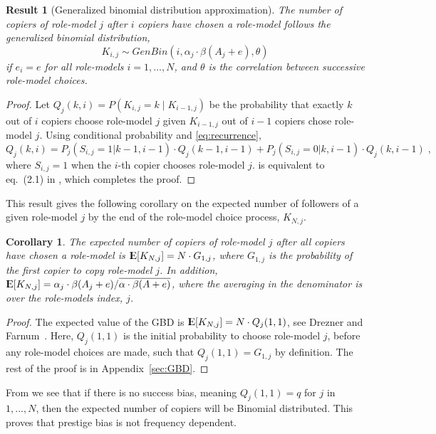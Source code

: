 \documentclass[12pt]{extarticle}
\DeclareMathOperator*{\E}{{\rm I\kern-.3em E}}
\newtheorem{corollary}{Corollary}
\newtheorem{result}{Result}
\begin{document}
\begin{result}[Generalized binomial distribution approximation]\label{res:GBD}
The number of copiers of role-model $j$ after $i$ copiers have chosen a role-model follows the generalized binomial distribution, $$K_{i,j} \sim \textit{GenBin}(i,\alpha_j\cdot\beta(A_j+e),\theta)$$ if $e_i=e$ for all role-models $i=1, \ldots, N$, and $\theta$ is the correlation between successive role-model choices.
\end{result}

\begin{proof}
{Let} $Q_j(k,i)=P(K_{i,j} = k \mid K_{i-1,j})$ {be} the probability that exactly $k$ out of $i$ copiers choose role-model $j$ given $K_{i-1,j}$ {out} of $i-1$ copiers chose role-model $j$. 
Using conditional probability and \cref{eq:recurrence},
\begin{equation}\label{recursive}
Q_j(k,i) = P_j(S_{i,j}=1 | k-1,i-1) \cdot Q_j(k-1,i-1) + P_j(S_{i,j} =0 | k,i-1) \cdot Q_j(k,i-1) \;,
\end{equation}
where $S_{i,j} =1 $ when the $i$-th copier chooses role-model $j$.
 is equivalent to eq.~(2.1) in \citep{GBD}, which completes the proof.
\end{proof}

This result gives the following corollary on the expected number of followers of a given role-model $j$ by the end of the role-model choice process, $K_{N,j}$.
\\


\begin{corollary}\label{cor:GBD} The expected number of copiers of role-model $j$ after all copiers have chosen a role-model is
$\E[K_{N,j}] = N \cdot G_{1,j}$, where $G_{1,j}$ is the probability of the first copier to copy role-model $j$.
In addition, $\E[K_{N, j}] = \alpha_j \cdot \beta(A_j+e) / \overline{\alpha \cdot \beta(A+e)}$, where the averaging in the denominator is over the role-models index, $j$.
\end{corollary}

\begin{proof}
The expected value of the GBD is
$\E[K_{N,j}] = N \cdot Q_j(1,1)$, see Drezner and Farnum~\citep[eq.~(2.3)]{GBD}.
Here, $Q_j(1,1)$ is the initial probability to choose role-model $j$, before any role-model choices are made, such that $Q_j(1,1) = G_{1,j}$ by definition.
The rest of the proof is in Appendix~\ref{sec:GBD}.
\end{proof}

From  we see that if there is no success bias, meaning $Q_j(1,1)=q$ for $j$ in $1,...,N$, then the expected number of copiers will be Binomial distributed. This proves that prestige bias is not frequency dependent.
\end{document}
